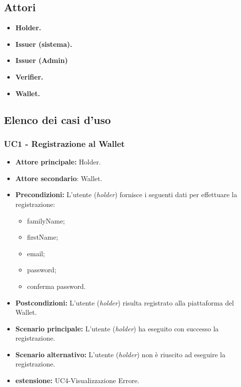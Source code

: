 \subsection{Attori}
\begin{itemize}
    \item\textbf{Holder.}
    \item\textbf{Issuer (sistema).}
    \item\textbf{Issuer (Admin)}
    \item\textbf{Verifier.}
    \item\textbf{Wallet.}
\end{itemize}

\subsection{Elenco dei casi d'uso}
\subsubsection{UC1 - Registrazione al Wallet}
\begin{itemize}
\item \textbf{Attore principale:} Holder.
\item \textbf{Attore secondario}: Wallet. 
\item \textbf{Precondizioni:} L’utente (\textit{holder}) fornisce i seguenti dati per effettuare la registrazione:
\begin{itemize}
    \item familyName;
    \item firstName;
    \item email;
    \item password;
    \item conferma password.
\end{itemize}
\item \textbf{Postcondizioni:} L’utente (\textit{holder}) risulta registrato alla piattaforma del Wallet.
\item \textbf{Scenario principale:} L'utente (\textit{holder}) ha eseguito con successo la registrazione.
\item \textbf{Scenario alternativo:} L'utente (\textit{holder}) non è riuscito ad eseguire la registrazione.
\item \textbf{estensione:} UC4-Visualizzazione Errore.
\end{itemize}

